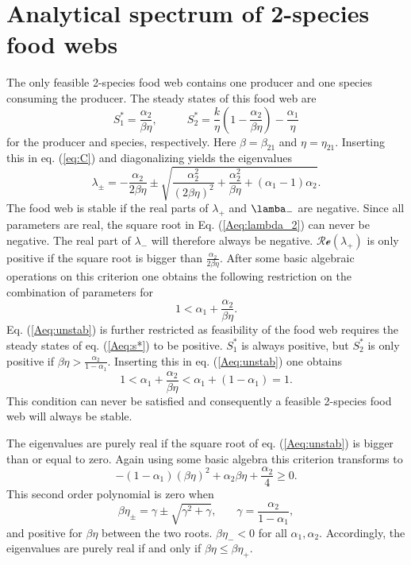 
\section{Analytical spectrum of 2-species food webs}
\label{A:analytical}
The only feasible 2-species food web contains one producer and one species consuming the producer. The steady states of this food web are 
\begin{equation}
    S_1^* = \frac{\alpha_2}{\beta\eta}, \:\:\:\:\:\:\:\:\:\:\:\: S_2^* = \frac{k}{\eta}\left( 1- \frac{\alpha_2}{\beta\eta} \right) - \frac{\alpha_1}{\eta} 
    \label{Aeq:s*}
\end{equation}
for the producer and species, respectively. Here $\beta = \beta_{21}$ and $\eta = \eta_{21}$. Inserting this in eq. (\ref{eq:C}) and diagonalizing yields the eigenvalues 
\begin{equation}
    \lambda_{\pm} = -\frac{\alpha_2}{2\beta\eta}\pm \sqrt{\frac{\alpha_2^2}{(2\beta\eta)^2} + \frac{\alpha_2^2}{\beta\eta} + \left(\alpha_1 - 1 \right)\alpha_2}.
    \label{Aeq:lambda_2}
\end{equation}
The food web is stable if the real parts of $\lambda_+$ and $\lamba_-$ are negative. Since all parameters are real, the square root in Eq. (\ref{Aeq:lambda_2}) can never be negative. The real part of $\lambda_-$ will therefore always be negative. $\mathcal{Re}(\lambda_+)$ is only positive if the square root is bigger than $\frac{\alpha_2}{2\beta\eta}$. After some basic algebraic operations on this criterion one obtains the following restriction on the combination of parameters for 
\begin{equation}
    1<\alpha_1 + \frac{\alpha_2}{\beta\eta}.
    \label{Aeq:unstab}
\end{equation}
Eq. (\ref{Aeq:unstab}) is further restricted as feasibility of the food web requires the steady states of eq. (\ref{Aeq:s*}) to be positive.
$S_1^*$ is always positive, but $S_2^*$ is only positive if $\beta\eta > \frac{\alpha_2}{1-\alpha_1}$. Inserting this in eq. (\ref{Aeq:unstab}) one obtains 
\begin{equation}
    1 < \alpha_1 + \frac{\alpha_2}{\beta\eta} < \alpha_1 + (1-\alpha_1) = 1.
\end{equation}
This condition can never be satisfied and consequently a feasible 2-species food web will always be stable.

The eigenvalues are purely real if the square root of eq. (\ref{Aeq:unstab}) is bigger than or equal to zero. Again using some basic algebra this criterion transforms to 
\begin{equation}
    -(1 - \alpha_1)(\beta\eta)^2 + \alpha_2\beta\eta + \frac{\alpha_2}{4} \geq 0.
    \label{eq:eta_real}
\end{equation}
This second order polynomial is zero when 
\begin{equation}
    \beta\eta_{\pm} = \gamma \pm \sqrt{\gamma^2 + \gamma}, \:\:\:\:\:\:\:\: \gamma = \frac{\alpha_2}{1-\alpha_1},
\end{equation}
and positive for $\beta\eta$ between the two roots. $\beta\eta_- < 0$ for all $\alpha_1, \alpha_2$. Accordingly, the eigenvalues are purely real if and only if $\beta\eta \leq \beta\eta_+$. 